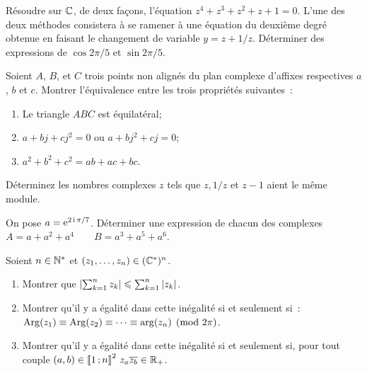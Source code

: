 \begin{exercice}
    Résoudre sur \(\mathbb{C}\), de deux façons, l'équation \(z^4 + z^3 + z^2 + z + 1 = 
    0\). L'une des deux méthodes consistera à se ramener à une équation du 
    deuxième degré obtenue en faisant le changement de variable \(y = z + 1/z\). 
    Déterminer des expressions de \(\cos 2\pi/5\) et \(\sin 2\pi/5\).
\end{exercice}

\begin{exercice}
    Soient \(A\), \(B\), et \(C\) trois points non alignés du plan complexe 
    d'affixes respectives \(a\), \(b\) et \(c\). Montrer l'équivalence entre les 
    trois propriétés suivantes~:
    \begin{enumerate}
        \item Le triangle \(ABC\) est équilatéral;
        \item \(a + bj + cj^2 = 0\) ou \(a + bj^2 + cj = 0\);
        \item \(a^2 + b^2 + c^2 = ab + ac + bc\).
    \end{enumerate}
\end{exercice}

\begin{exercice}
    Déterminez les nombres complexes \(z\) tels que \(z, 1/z\) et \(z-1\) aient 
    le même module.
\end{exercice}

\begin{exercice}
    On pose \(a = \operatorname{e}^{2\operatorname{i}\pi/7}\). Déterminer une expression de chacun des 
    complexes \(A = a + a^2 + a^4 \qquad B = a^3 + a^5 + a^6\).
\end{exercice}

\begin{exercice}
    Soient \(n \in \mathbb{N}^{*}\) et \((z_1, \ldots, z_n) \in (\mathbb{C}^{*})^n\).
    \begin{enumerate}
        \item Montrer que \( \left\lvert\sum_{k = 1}^n z_k\right\rvert \leqslant \sum_{k = 1}^n 
            \left\lvert z_k\right\rvert\).
        \item Montrer qu'il y a égalité dans cette inégalité si et seulement 
            si~: \(\operatorname{Arg}(z_1) \equiv \operatorname{Arg}(z_2) \equiv \cdots \equiv \arg(z_n) 
            \pmod{2\pi}\).
        \item Montrer qu'il y a égalité dans cette inégalité si et seulement si, 
            pour tout couple \((a,b) \in \mathopen{\llbracket}1\mathclose{}\mathpunct{};n\mathclose{\rrbracket}^2 \ z_a 
            \overline{z_b} \in \mathbb{R}_{+}\).
    \end{enumerate}
\end{exercice}

